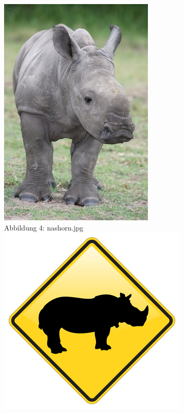\includegraphics[scale=0.6]{bilder/nasohnehorn.png }\\
Abbildung 4: nashorn.jpg\\
\includegraphics[scale=0.6]{bilder/nashorn.png }\\
